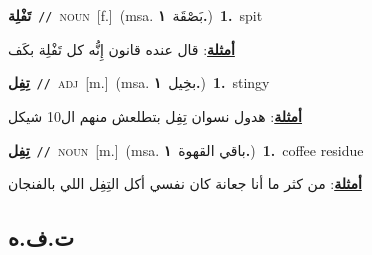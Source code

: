 \documentclass[10pt,a4paper,twoside]{article} %
\begin{document}
\begin{multicols}{2}
{\setlength\topsep{0pt}\textbf{\foreignlanguage{arabic}{تَفْلِة}}\ {\color{gray}\texttt{//}\color{black}}\ \textsc{noun}\ [f.]\ \color{gray}(msa. \foreignlanguage{arabic}{بَصْقَة}~\foreignlanguage{arabic}{\textbf{١.}})\color{black}\ \textbf{1.}~spit\  \begin{flushright}\color{gray}\foreignlanguage{arabic}{\textbf{\underline{\foreignlanguage{arabic}{أمثلة}}}: قال عنده قانون إِنُّه كل تَفْلِة بكَف}\end{flushright}\color{black}} \vspace{2mm}

{\setlength\topsep{0pt}\textbf{\foreignlanguage{arabic}{تِفِل}}\ {\color{gray}\texttt{//}\color{black}}\ \textsc{adj}\ [m.]\ \color{gray}(msa. \foreignlanguage{arabic}{بخِيل}~\foreignlanguage{arabic}{\textbf{١.}})\color{black}\ \textbf{1.}~stingy\  \begin{flushright}\color{gray}\foreignlanguage{arabic}{\textbf{\underline{\foreignlanguage{arabic}{أمثلة}}}: هدول نسوان تِفِل بتطلعش منهم ال10 شيكل}\end{flushright}\color{black}} \vspace{2mm}

{\setlength\topsep{0pt}\textbf{\foreignlanguage{arabic}{تِفِل}}\ {\color{gray}\texttt{//}\color{black}}\ \textsc{noun}\ [m.]\ \color{gray}(msa. \foreignlanguage{arabic}{باقي القهوة}~\foreignlanguage{arabic}{\textbf{١.}})\color{black}\ \textbf{1.}~coffee residue\  \begin{flushright}\color{gray}\foreignlanguage{arabic}{\textbf{\underline{\foreignlanguage{arabic}{أمثلة}}}: من كثر ما أنا جعانة كان نفسي أكل التِفِل اللي بالفنجان}\end{flushright}\color{black}} \vspace{2mm}

\vspace{-3mm}
\subsection*{\color{blue}\foreignlanguage{arabic}{ت.ف.ه}\color{blue}{}} 


\end{multicols}
\end{document}
